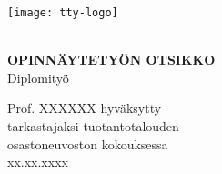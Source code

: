 \thispagestyle{empty}

\vspace*{-.5cm}\noindent


\texttt{[image: tty-logo]}

\vspace{6.8cm}

\\
{\bf\large \textsf{OPINNÄYTETYÖN OTSIKKO}}\\
\textsf{Diplomityö}

\vspace{8.7cm} %

\begin{flushright}

\begin{minipage}[c]{6.8cm}
\begin{spacing}{1.0}
\textsf{Prof. XXXXXX hyväksytty}\\
\textsf{tarkastajaksi tuotantotalouden}\\
\textsf{osastoneuvoston kokouksessa}\\
\textsf{xx.xx.xxxx}\\
\end{spacing}
\end{minipage}
\end{flushright}